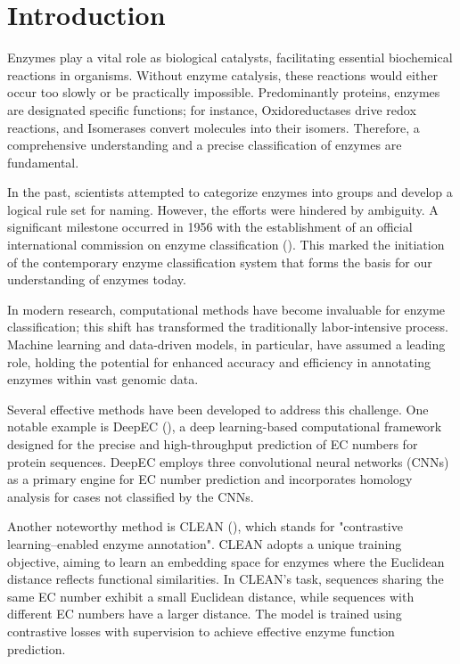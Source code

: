 \documentclass{bioinfo}
\begin{document}
\section{Introduction}

Enzymes play a vital role as biological catalysts, facilitating essential biochemical reactions in organisms.
Without enzyme catalysis, these reactions would either occur too slowly or be practically impossible.
Predominantly proteins, enzymes are designated specific functions; for instance, Oxidoreductases drive redox reactions, and Isomerases convert molecules into their isomers.
Therefore, a comprehensive understanding and a precise classification of enzymes are fundamental.

In the past, scientists attempted to categorize enzymes into groups and develop a logical rule set for naming.
However, the efforts were hindered by ambiguity.
A significant milestone occurred in 1956 with the establishment of an official international commission on enzyme classification (\cite{IUBMB}).
This marked the initiation of the contemporary enzyme classification system that forms the basis for our understanding of enzymes today.

In modern research, computational methods have become invaluable for enzyme classification; this shift has transformed the traditionally labor-intensive process.
Machine learning and data-driven models, in particular, have assumed a leading role, holding the potential for enhanced accuracy and efficiency in annotating enzymes within vast genomic data.

Several effective methods have been developed to address this challenge.
One notable example is DeepEC (\cite{DeepEC}), a deep learning-based computational framework designed for the precise and high-throughput prediction of EC numbers for protein sequences.
DeepEC employs three convolutional neural networks (CNNs) as a primary engine for EC number prediction and incorporates homology analysis for cases not classified by the CNNs.

Another noteworthy method is CLEAN (\cite{CleanArticle}), which stands for "contrastive learning–enabled 
enzyme annotation". CLEAN adopts a unique training objective, aiming to learn an embedding space for enzymes where the Euclidean distance 
reflects functional similarities. In CLEAN's task, sequences sharing the same EC number exhibit a small Euclidean distance, while sequences 
with different EC numbers have a larger distance. The model is trained using contrastive losses with supervision to achieve effective 
enzyme function prediction.
\end{document}
